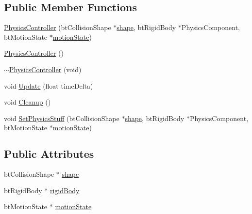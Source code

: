 \subsection*{Public Member Functions}
\begin{DoxyCompactItemize}
\item 
\hyperlink{class_b_g_e_1_1_physics_controller_a1a1cd37fa14f0a2ce28bb7b4133d4acc}{Physics\-Controller} (bt\-Collision\-Shape $\ast$\hyperlink{class_b_g_e_1_1_physics_controller_afa0cda526c5c9f57a678bb46867801a1}{shape}, bt\-Rigid\-Body $\ast$Physics\-Component, bt\-Motion\-State $\ast$\hyperlink{class_b_g_e_1_1_physics_controller_a2aaedaba9d70aa1d328105c4cdf0b13c}{motion\-State})
\item 
\hyperlink{class_b_g_e_1_1_physics_controller_a3a55d6dc9688639ed6a2fe822490885e}{Physics\-Controller} ()
\item 
\hyperlink{class_b_g_e_1_1_physics_controller_a9cb99493c2151a702e56290052736ace}{$\sim$\-Physics\-Controller} (void)
\item 
void \hyperlink{class_b_g_e_1_1_physics_controller_a1c49abb1bbcd5002b81b2176a41278f0}{Update} (float time\-Delta)
\item 
void \hyperlink{class_b_g_e_1_1_physics_controller_afda8e323ab8addd4e46ccc13ed929969}{Cleanup} ()
\item 
void \hyperlink{class_b_g_e_1_1_physics_controller_ac9111cef9bc80edf5626305e46829993}{Set\-Physics\-Stuff} (bt\-Collision\-Shape $\ast$\hyperlink{class_b_g_e_1_1_physics_controller_afa0cda526c5c9f57a678bb46867801a1}{shape}, bt\-Rigid\-Body $\ast$Physics\-Component, bt\-Motion\-State $\ast$\hyperlink{class_b_g_e_1_1_physics_controller_a2aaedaba9d70aa1d328105c4cdf0b13c}{motion\-State})
\end{DoxyCompactItemize}
\subsection*{Public Attributes}
\begin{DoxyCompactItemize}
\item 
bt\-Collision\-Shape $\ast$ \hyperlink{class_b_g_e_1_1_physics_controller_afa0cda526c5c9f57a678bb46867801a1}{shape}
\item 
bt\-Rigid\-Body $\ast$ \hyperlink{class_b_g_e_1_1_physics_controller_a8987f42fe8e3fd87e15f0105ee4b9936}{rigid\-Body}
\item 
bt\-Motion\-State $\ast$ \hyperlink{class_b_g_e_1_1_physics_controller_a2aaedaba9d70aa1d328105c4cdf0b13c}{motion\-State}
\end{DoxyCompactItemize}


